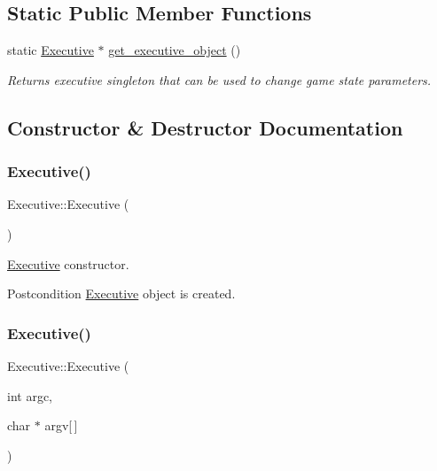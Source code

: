 \subsection*{Static Public Member Functions}
\begin{DoxyCompactItemize}
\item 
\mbox{\label{classExecutive_abd86af2454e1c72a9c5eeb047eed7a8d}} 
static \mbox{\hyperlink{classExecutive}{Executive}} $\ast$ \mbox{\hyperlink{classExecutive_abd86af2454e1c72a9c5eeb047eed7a8d}{get\+\_\+executive\+\_\+object}} ()
\begin{DoxyCompactList}\small\item\em Returns executive singleton that can be used to change game state parameters. \end{DoxyCompactList}\end{DoxyCompactItemize}


\subsection{Constructor \& Destructor Documentation}
\mbox{\label{classExecutive_ad870c1d741f1f313eb0c5a8336f8af6b}} 
\subsubsection{\texorpdfstring{Executive()}{Executive()}\hspace{0.1cm}{\footnotesize\ttfamily [1/2]}}
{\footnotesize\ttfamily Executive\+::\+Executive (\begin{DoxyParamCaption}{ }\end{DoxyParamCaption})}



\mbox{\hyperlink{classExecutive}{Executive}} constructor. 

\begin{DoxyPostcond}{Postcondition}
\mbox{\hyperlink{classExecutive}{Executive}} object is created. 
\end{DoxyPostcond}
\mbox{\label{classExecutive_a45c48b992ab4d768131b67d8c43bd32e}} 
\subsubsection{\texorpdfstring{Executive()}{Executive()}\hspace{0.1cm}{\footnotesize\ttfamily [2/2]}}
{\footnotesize\ttfamily Executive\+::\+Executive (\begin{DoxyParamCaption}\item[{int}]{argc,  }\item[{char $\ast$}]{argv\mbox{[}$\,$\mbox{]} }\end{DoxyParamCaption})}



